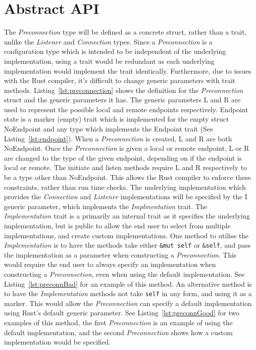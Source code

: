 \documentclass{l4proj}
\begin{document}
\section{Abstract API}\label{sec:abstract-api}
The \emph{Preconnection} type will be defined as a concrete struct, rather than a trait, unlike the \emph{Listener} and
\emph{Connection} types.
Since a \emph{Preconnection} is a configuration type which is intended to be independent of the underlying
implementation, using a trait would be redundant as each underlying implementation would implement the trait identically.
Furthermore, due to issues with the Rust compiler, it's difficult to change generic parameters with trait methods.
Listing~\ref{lst:preconnection} shows the definition for the \emph{Preconnection} struct and the generic parameters it
has.
The generic parameters L and R are used to represent the possible local and remote endpoints respectively.
Endpoint state is a marker (empty) trait which is implemented for the empty struct NoEndpoint and any type which
implements the Endpoint trait (See Listing~\ref{lst:endpoint}).
When a \emph{Preconnection} is created, L and R are both NoEndpoint.
Once the \emph{Preconnection} is given a local or remote endpoint, L or R are changed to the type of the given endpoint,
depending on if the endpoint is local or remote.
The initiate and listen methods require L and R respectively to be a type other than NoEndpoint.
This allows the Rust compiler to enforce these constraints, rather than run time checks.
The underlying implementation which provides the \emph{Connection} and \emph{Listener} implementations will be specified
by the I generic parameter, which implements the \emph{Implmentation} trait.
The \emph{Implementation} trait is a primarily an internal trait as it specifies the underlying implementation, but is
public to allow the end user to select from multiple implementations, and create custom implementations.
One method to utilise the \emph{Implementation} is to have the methods take either \texttt{\&mut self} or
\texttt{\&self}, and pass the implementation as a parameter when constructing a \emph{Preconnection}.
This would require the end user to always specify an implementation when constructing a \emph{Preconnection}, even when
using the default implementation.
See Listing~\ref{lst:preconnBad} for an example of this method.
An alternative method is to have the \emph{Implementation} methods not take \texttt{self} in any form, and using it as a
marker.
This would allow the \emph{Preconnection} can specify a default implementation using Rust's default generic parameter.
See Listing~\ref{lst:preconnGood} for two examples of this method, the first \emph{Preconnection} is an example of using
the default implementation, and the second \emph{Preconnection} shows how a custom implementation would be specified.
\end{document}
